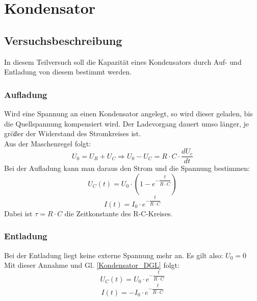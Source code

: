 \documentclass[12pt,a4paper]{article}
\author{Tim}
\begin{document}
\tableofcontents
\newpage

\section{Kondensator}
\subsection{Versuchsbeschreibung}
In diesem Teilversuch soll die Kapazität eines Kondensators durch Auf- und Entladung von diesem bestimmt werden.
\subsubsection{Aufladung}
Wird eine Spannung an einen Kondensator angelegt, so wird dieser geladen, bis die Quellspannung kompensiert wird. Der Ladevorgang dauert umso länger, je größer der Widerstand des Stromkreises ist.\\
Aus der Maschenregel folgt:
\begin{equation}
U_0 = U_R + U_C \Rightarrow U_0 - U_C = R\cdot C\cdot \dfrac{dU_c}{dt}
\label{Kondensator_DGL}
\end{equation}
Bei der Aufladung kann man daraus den Strom und die Spannung bestimmen:
\begin{equation}
U_C(t) = U_0 \cdot (1-e^{-\dfrac{t}{R\cdot C}})
\end{equation}
\begin{equation}
I(t) = I_0 \cdot e^{-\dfrac{t}{R\cdot C}}
\end{equation}
Dabei ist $\tau = R \cdot C$ die Zeitkonstante des R-C-Kreises.
\subsubsection{Entladung}
Bei der Entladung liegt keine externe Spannung mehr an. Es gilt also: $U_0 = 0$\\
Mit dieser Annahme und Gl. \ref{Kondensator_DGL} folgt:
\begin{equation}
U_C(t) = U_0 \cdot e^{-\dfrac{t}{R\cdot C}}
\end{equation}
\begin{equation}
I(t) = -I_0 \cdot e^{-\dfrac{t}{R\cdot C}}
\end{equation}
\end{document}
